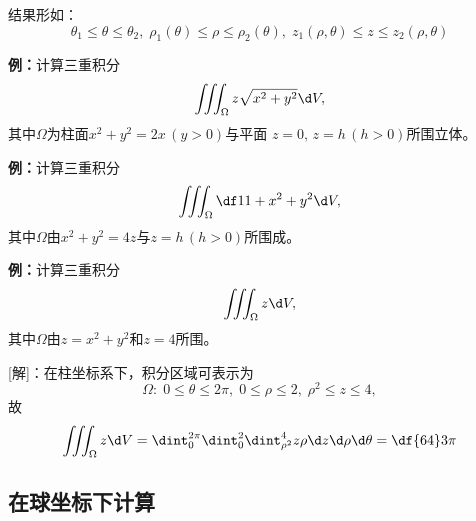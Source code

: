 结果形如：
$$\theta_1\leq\theta\leq\theta_2,\;
\rho_1(\theta)\leq\rho\leq\rho_2(\theta),\;
z_1(\rho,\theta)\leq z\leq z_2(\rho,\theta)$$

{\bf 例：}计算三重积分
$$\iiint_{\Omega}z\sqrt{x^2+y^2}\d V,$$
其中$\Omega$为柱面$x^2+y^2=2x\,(y>0)$与平面
$z=0,\,z=h\,(h>0)$所围立体。

{\bf 例：}计算三重积分
$$\iiint_{\Omega}\df 1{1+x^2+y^2}\d V,$$
其中$\Omega$由$x^2+y^2=4z$与$z=h\,(h>0)$所围成。

{\bf 例：}计算三重积分
$$\iiint_{\Omega}z\d V,$$
其中$\Omega$由$z=x^2+y^2$和$z=4$所围。

[解]：在柱坐标系下，积分区域可表示为
$$\Omega:\;0\leq\theta\leq2\pi,\;0\leq\rho\leq2,\;\rho^2\leq z\leq4,$$
故
$$\iiint_{\Omega}z\d V=
\dint_0^{2\pi}\dint_0^2\dint_{\rho^2}^4z\rho\d z\d\rho\d\theta
=\df{64}3\pi$$
\fin

\subsection{在球坐标下计算}

